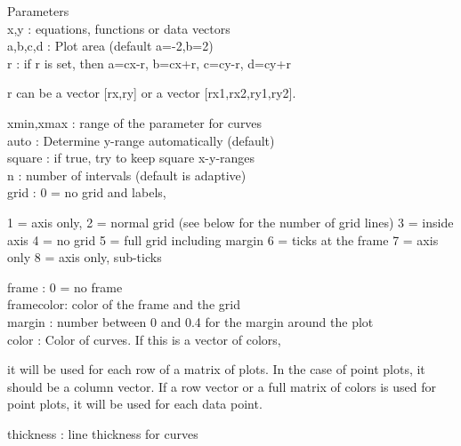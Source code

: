 \documentclass[a4paper,10pt]{article}
\begin{document}
\begin{eulernotebook}
\begin{eulercomment}
\begin{eulercomment}
\begin{eulercomment}
\begin{eulercomment}
\begin{eulercomment}
Parameters
\\
x,y       : equations, functions or data vectors\\
a,b,c,d   : Plot area (default a=-2,b=2)\\
r         : if r is set, then a=cx-r, b=cx+r, c=cy-r, d=cy+r\\
\end{eulercomment}
\begin{eulerttcomment}
            r can be a vector [rx,ry] or a vector [rx1,rx2,ry1,ry2].
\end{eulerttcomment}
\begin{eulercomment}
xmin,xmax : range of the parameter for curves\\
auto      : Determine y-range automatically (default)\\
square    : if true, try to keep square x-y-ranges\\
n         : number of intervals (default is adaptive)\\
grid      : 0 = no grid and labels,\\
\end{eulercomment}
\begin{eulerttcomment}
            1 = axis only,
            2 = normal grid (see below for the number of grid lines)
            3 = inside axis
            4 = no grid
            5 = full grid including margin
            6 = ticks at the frame
            7 = axis only
            8 = axis only, sub-ticks
\end{eulerttcomment}
\begin{eulercomment}
frame     : 0 = no frame\\
framecolor: color of the frame and the grid\\
margin    : number between 0 and 0.4 for the margin around the plot\\
color     : Color of curves. If this is a vector of colors,\\
\end{eulercomment}
\begin{eulerttcomment}
            it will be used for each row of a matrix of plots. In the case of
            point plots, it should be a column vector. If a row vector or a
            full matrix of colors is used for point plots, it will be used for
            each data point.
\end{eulerttcomment}
\begin{eulercomment}
thickness : line thickness for curves\\
\end{eulercomment}

\end{eulercomment}
\end{eulercomment}
\end{eulercomment}
\end{eulercomment}
\end{eulernotebook}
\end{document}
